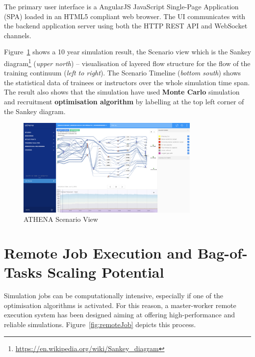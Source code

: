The primary user interface is a AngularJS JavaScript Single-Page Application (SPA) loaded in an HTML5 compliant web browser. The UI communicates with the backend application server using both the HTTP REST API and WebSocket channels.

Figure~\ref{fig:scenarioScreen} shows a 10 year simulation result, the Scenario view which is the Sankey diagram\footnote{\url{https://en.wikipedia.org/wiki/Sankey_diagram}} (\textit{upper north}) -- visualisation of layered flow structure for the flow of the training continuum (\textit{left to right}). The Scenario Timeline (\textit{bottom south}) shows the statistical data of trainees or instructors over the whole simulation time span. The result also shows that the simulation have used \textbf{Monte Carlo} simulation and recruitment \textbf{optimisation algorithm} by labelling at the top left corner of the Sankey diagram.

\begin{figure}
\centering
\includegraphics[width=0.8\textwidth]{Figures/ATHENA_scenario_screen}
\decoRule
\caption[ATHENA Scenario View]{ATHENA Scenario View}
\label{fig:scenarioScreen}
\end{figure}

\section{Remote Job Execution and Bag-of-Tasks Scaling Potential}

Simulation jobs can be computationally intensive, especially if one of the optimisation algorithms is activated. For this reason, a master-worker remote execution system has been designed aiming at offering high-performance and reliable simulations. Figure~\ref{fig:remoteJob} depicts this process.

